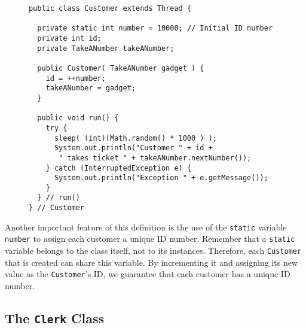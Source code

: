 \begin{figure}[h!]
\jjjprogstart
\begin{jjjlisting}
\begin{lstlisting}
public class Customer extends Thread {

  private static int number = 10000; // Initial ID number
  private int id;
  private TakeANumber takeANumber;

  public Customer( TakeANumber gadget ) {
    id = ++number;
    takeANumber = gadget;
  }

  public void run() {
    try {
      sleep( (int)(Math.random() * 1000 ) );
      System.out.println("Customer " + id + 
       " takes ticket " + takeANumber.nextNumber());
    } catch (InterruptedException e) {
      System.out.println("Exception " + e.getMessage());
    }
  } // run()
} // Customer
\end{lstlisting}
\end{jjjlisting}
\end{figure}

Another important feature of this definition is the use of the
{\tt static} variable {\tt number} to assign each customer a unique ID
number.   Remember that a {\tt static} variable belongs to the class
itself, not to its instances.  Therefore, each {\tt Customer} that is
created can share this variable.  By incrementing it and assigning its
new value as the {\tt Customer}'s ID, we guarantee that each customer
has a unique ID number.





\subsection{The {\tt Clerk} Class}


